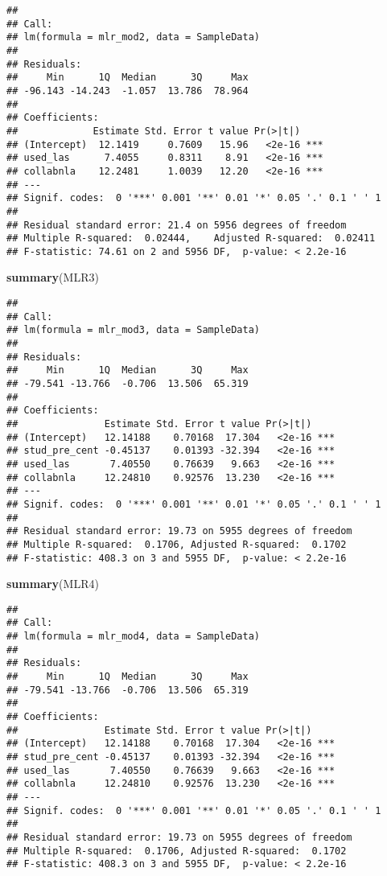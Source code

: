 \documentclass[]{article}
\newenvironment{Shaded}{\begin{snugshade}}{\end{snugshade}}
\newcommand{\KeywordTok}[1]{\textcolor[rgb]{0.13,0.29,0.53}{\textbf{#1}}}
\newcommand{\NormalTok}[1]{#1}
\begin{document}
\begin{verbatim}
## 
## Call:
## lm(formula = mlr_mod2, data = SampleData)
## 
## Residuals:
##     Min      1Q  Median      3Q     Max 
## -96.143 -14.243  -1.057  13.786  78.964 
## 
## Coefficients:
##             Estimate Std. Error t value Pr(>|t|)    
## (Intercept)  12.1419     0.7609   15.96   <2e-16 ***
## used_las      7.4055     0.8311    8.91   <2e-16 ***
## collabnla    12.2481     1.0039   12.20   <2e-16 ***
## ---
## Signif. codes:  0 '***' 0.001 '**' 0.01 '*' 0.05 '.' 0.1 ' ' 1
## 
## Residual standard error: 21.4 on 5956 degrees of freedom
## Multiple R-squared:  0.02444,    Adjusted R-squared:  0.02411 
## F-statistic: 74.61 on 2 and 5956 DF,  p-value: < 2.2e-16
\end{verbatim}

\begin{Shaded}
\begin{Highlighting}[]
\KeywordTok{summary}\NormalTok{(MLR3)}
\end{Highlighting}
\end{Shaded}

\begin{verbatim}
## 
## Call:
## lm(formula = mlr_mod3, data = SampleData)
## 
## Residuals:
##     Min      1Q  Median      3Q     Max 
## -79.541 -13.766  -0.706  13.506  65.319 
## 
## Coefficients:
##               Estimate Std. Error t value Pr(>|t|)    
## (Intercept)   12.14188    0.70168  17.304   <2e-16 ***
## stud_pre_cent -0.45137    0.01393 -32.394   <2e-16 ***
## used_las       7.40550    0.76639   9.663   <2e-16 ***
## collabnla     12.24810    0.92576  13.230   <2e-16 ***
## ---
## Signif. codes:  0 '***' 0.001 '**' 0.01 '*' 0.05 '.' 0.1 ' ' 1
## 
## Residual standard error: 19.73 on 5955 degrees of freedom
## Multiple R-squared:  0.1706, Adjusted R-squared:  0.1702 
## F-statistic: 408.3 on 3 and 5955 DF,  p-value: < 2.2e-16
\end{verbatim}

\begin{Shaded}
\begin{Highlighting}[]
\KeywordTok{summary}\NormalTok{(MLR4)}
\end{Highlighting}
\end{Shaded}

\begin{verbatim}
## 
## Call:
## lm(formula = mlr_mod4, data = SampleData)
## 
## Residuals:
##     Min      1Q  Median      3Q     Max 
## -79.541 -13.766  -0.706  13.506  65.319 
## 
## Coefficients:
##               Estimate Std. Error t value Pr(>|t|)    
## (Intercept)   12.14188    0.70168  17.304   <2e-16 ***
## stud_pre_cent -0.45137    0.01393 -32.394   <2e-16 ***
## used_las       7.40550    0.76639   9.663   <2e-16 ***
## collabnla     12.24810    0.92576  13.230   <2e-16 ***
## ---
## Signif. codes:  0 '***' 0.001 '**' 0.01 '*' 0.05 '.' 0.1 ' ' 1
## 
## Residual standard error: 19.73 on 5955 degrees of freedom
## Multiple R-squared:  0.1706, Adjusted R-squared:  0.1702 
## F-statistic: 408.3 on 3 and 5955 DF,  p-value: < 2.2e-16
\end{verbatim}
\end{document}
